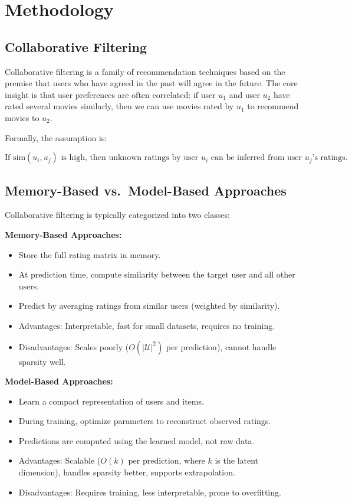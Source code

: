 \section{Methodology}
\label{sec:methodology}

\subsection{Collaborative Filtering}

Collaborative filtering is a family of recommendation techniques based on the premise that users who have 
agreed in the past will agree in the future. The core insight is that user preferences are often correlated: 
if user $u_1$ and user $u_2$ have rated several movies similarly, then we can use movies rated by $u_1$ to 
recommend movies to $u_2$.

Formally, the assumption is:

\[
  \text{If } \text{sim}(u_i, u_j) \text{ is high, then unknown ratings by user } u_i 
  \text{ can be inferred from user } u_j \text{'s ratings.}
\]

\subsection{Memory-Based vs.~Model-Based Approaches}

Collaborative filtering is typically categorized into two classes:

\textbf{Memory-Based Approaches:}
\begin{itemize}
  \item Store the full rating matrix in memory.
  \item At prediction time, compute similarity between the target user and all other users.
  \item Predict by averaging ratings from similar users (weighted by similarity).
  \item Advantages: Interpretable, fast for small datasets, requires no training.
  \item Disadvantages: Scales poorly ($O(|\mathcal{U}|^2)$ per prediction), cannot handle sparsity well.
\end{itemize}

\textbf{Model-Based Approaches:}
\begin{itemize}
  \item Learn a compact representation of users and items.
  \item During training, optimize parameters to reconstruct observed ratings.
  \item Predictions are computed using the learned model, not raw data.
  \item Advantages: Scalable ($O(k)$ per prediction, where $k$ is the latent dimension), handles sparsity 
  better, supports extrapolation.
  \item Disadvantages: Requires training, less interpretable, prone to overfitting.
\end{itemize}


